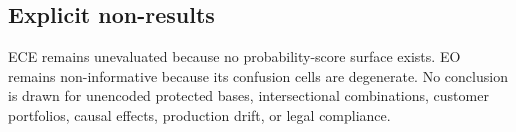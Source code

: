 \subsection{Explicit non-results}

ECE remains unevaluated because no probability-score surface exists. EO remains non-informative
because its confusion cells are degenerate. No conclusion is drawn for unencoded protected bases,
intersectional combinations, customer portfolios, causal effects, production drift, or legal
compliance.
